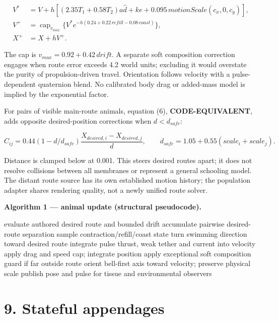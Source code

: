 \documentclass[
  english,
  11pt,
]{article}
\newenvironment{Shaded}{}{}
\newcommand{\NormalTok}[1]{#1}
\begin{document}
\[
\begin{aligned}
V^*&=V+h[(2.35T_1+0.58T_2)a\hat d+ke
          +0.095\,motionScale(c_x,0,c_y)],\\
V^+&=\operatorname{cap}_{v_{max}}\{V^*e^{-h(0.24+0.22\,refill-0.08\,coast)}\},\\
X^+&=X+hV^+.
\end{aligned}
\]

The cap is \(v_{max}=0.92+0.42\,drift\). A separate soft composition
correction engages when route error exceeds 4.2 world units; excluding
it would overstate the purity of propulsion-driven travel. Orientation
follows velocity with a pulse-dependent quaternion blend. No calibrated
body drag or added-mass model is implied by the exponential factor.

For pairs of visible main-route animals, equation (6),
\textbf{CODE-EQUIVALENT}, adds opposite desired-position corrections
when \(d<d_{safe}\):

\[
C_{ij}=0.44(1-d/d_{safe})\frac{X_{desired,i}-X_{desired,j}}{d},
\qquad d_{safe}=1.05+0.55(scale_i+scale_j).
\]

Distance is clamped below at 0.001. This steers desired routes apart; it
does not resolve collisions between all membranes or represent a general
schooling model. The distant route source has its own established motion
history; the population adapter shares rendering quality, not a newly
unified route solver.

\textbf{Algorithm 1 --- animal update (structural pseudocode).}

\begin{Shaded}
\begin{Highlighting}[]
\NormalTok{evaluate authored desired route and bounded drift}
\NormalTok{accumulate pairwise desired{-}route separation}
\NormalTok{sample contraction/refill/coast state}
\NormalTok{turn swimming direction toward desired route}
\NormalTok{integrate pulse thrust, weak tether and current into velocity}
\NormalTok{apply drag and speed cap; integrate position}
\NormalTok{apply exceptional soft composition guard if far outside route}
\NormalTok{orient bell{-}first axis toward velocity; preserve physical scale}
\NormalTok{publish pose and pulse for tissue and environmental observers}
\end{Highlighting}
\end{Shaded}

\section{9. Stateful appendages}\label{stateful-appendages}
\end{document}
